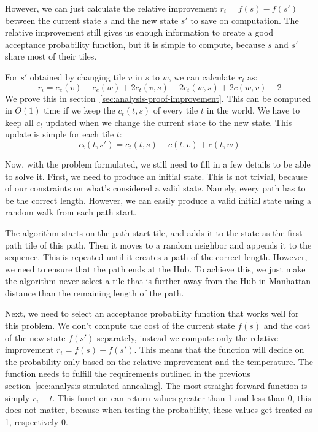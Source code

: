 However, we can just calculate the relative improvement $r_i = f(s) - f(s')$ between the current state $s$ and the new state $s'$ to save on computation.
The relative improvement still gives us enough information to create a good acceptance probability function, but it is simple to compute, because $s$ and $s'$ share most of their tiles.

For $s'$ obtained by changing tile $v$ in $s$ to $w$, we can calculate $r_i$ as:
\begin{equation*}
    r_i = c_e(v) - c_e(w)  + 2 c_t(v,s) - 2 c_t(w,s) + 2c(w,v) - 2
\end{equation*}
We prove this in section~\ref{sec:analysis-proof-improvement}.
This can be computed in $O(1)$ time if we keep the $c_t(t,s)$ of every tile $t$ in the world.
We have to keep all $c_t$ updated when we change the current state to the new state.
This update is simple for each tile $t$:
\begin{equation*}
    c_t(t,s') = c_t(t,s) - c(t,v) + c(t,w)
\end{equation*}

Now, with the problem formulated, we still need to fill in a few details to be able to solve it.
First, we need to produce an initial state.
This is not trivial, because of our constraints on what's considered a valid state.
Namely, every path has to be the correct length.
However, we can easily produce a valid initial state using a random walk from each path start.

The algorithm starts on the path start tile, and adds it to the state as the first path tile of this path.
Then it moves to a random neighbor and appends it to the sequence.
This is repeated until it creates a path of the correct length.
However, we need to ensure that the path ends at the Hub.
To achieve this, we just make the algorithm never select a tile that is further away from the Hub in Manhattan distance than the remaining length of the path.

Next, we need to select an acceptance probability function that works well for this problem.
We don't compute the cost of the current state $f(s)$ and the cost of the new state $f(s')$ separately, instead we compute only the relative improvement $r_i = f(s) - f(s')$.
This means that the function will decide on the probability only based on the relative improvement and the temperature.
The function needs to fulfill the requirements outlined in the previous section~\ref{sec:analysis-simulated-annealing}.
The most straight-forward function is simply $r_i - t$.
This function can return values greater than 1 and less than 0, this does not matter, because when testing the probability, these values get treated as 1, respectively 0.

